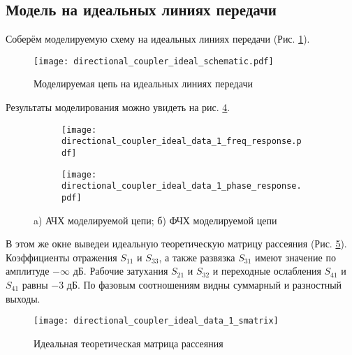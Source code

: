 \subsection{Модель на идеальных линиях передачи}

Соберём моделируемую схему на идеальных линиях передачи (Рис. \ref{fig:directional_coupler_ideal_schematic}).

\begin{figure}[!ht]
    \centering
    \texttt{[image: directional\_coupler\_ideal\_schematic.pdf]}
    \caption{Моделируемая цепь на идеальных линиях передачи}
    \label{fig:directional_coupler_ideal_schematic}
\end{figure}

Результаты моделирования можно увидеть на рис. \ref{fig:directional_coupler_ideal_data_1}.

\begin{figure}[!ht]
    \centering
    \begin{subfigure}[b]{0.40\textwidth}
        \centering
        \texttt{[image: directional\_coupler\_ideal\_data\_1\_freq\_response.pdf]}
        \caption{}
        \label{fig:directional_coupler_ideal_data_1_freq_response}
    \end{subfigure}
    \hfill
    \begin{subfigure}[b]{0.40\textwidth}
        \centering
        \texttt{[image: directional\_coupler\_ideal\_data\_1\_phase\_response.pdf]}
        \caption{}
        \label{fig:directional_coupler_ideal_data_1_phase_response}
    \end{subfigure}
    \caption{
        a) АЧХ моделируемой цепи;
        б) ФЧХ моделируемой цепи
    }
    \label{fig:directional_coupler_ideal_data_1}
\end{figure}

В этом же окне выведеи идеальную теоретическую матрицу рассеяния (Рис. \ref{fig:directional_coupler_ideal_data_1_smatrix}).
Коэффициенты отражения $S_{11}$ и $S_{33}$, а также развязка $S_{31}$ имеют значение по амплитуде $-\infty \text{~дБ}$. Рабочие затухания $S_{21}$ и $S_{32}$ и переходные ослабления $S_{41}$ и $S_{41}$ равны $-3 \text{~дБ}$. По фазовым соотношениям видны суммарный и разностный выходы.
\begin{figure}[!ht]
    \centering
    \texttt{[image: directional\_coupler\_ideal\_data\_1\_smatrix]}
    \caption{Идеальная теоретическая матрица рассеяния}
    \label{fig:directional_coupler_ideal_data_1_smatrix}
\end{figure}


